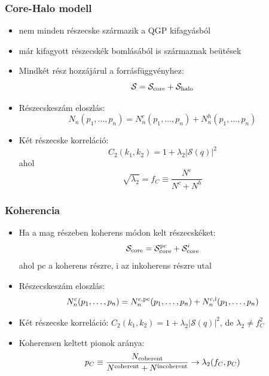 \documentclass{beamer}
\begin{document}
\begin{frame}
\frametitle{Core-Halo modell}
\begin{itemize}
\setlength{\itemsep}{8pt}
\item nem minden részecske származik a QGP kifagyásból
\item már kifagyott részecskék bomlásából is származnak beütések
\item Mindkét rész hozzájárul a forrásfüggvényhez:
\begin{equation*}
\mathcal{S}=\mathcal{S}_{\rm core}+\mathcal{S}_{\rm halo}
\end{equation*}
\item Részecskeszám eloszlás:
\begin{equation*}
N_n(p_1,\dots,p_n) = N_n^{c}(p_1,\dots,p_n)+N_n^{h}(p_1,\dots,p_n)
\end{equation*}
\item Két részecske korreláció:
\begin{equation*}
C_2(k_1, k_2) =  1+\lambda_2|\mathcal{S}(q)|^2
\end{equation*}
ahol
\begin{equation*}
\sqrt{\lambda_2} =  f_C \equiv \frac{N^c}{N^c+N^h} 
\end{equation*}
\end{itemize}
\end{frame}

\begin{frame}
\frametitle{Koherencia}
\begin{itemize}
\setlength{\itemsep}{8pt}
\item Ha a mag részeben koherens módon kelt részecskéket:
\begin{equation*}
\mathcal{S}_{\rm core}=\mathcal{S}_{\rm core}^{\rm pc}+\mathcal{S}_{\rm core}^{i}
\end{equation*}
ahol pc a koherens részre, i az inkoherens részre utal
\item Részecskeszám eloszlás:
\begin{equation*}
N_n^{c}(p_1,\dots,p_n) = N_n^{c,{\rm pc}}(p_1,\dots,p_n)+N_n^{c, {\rm i}}(p_1,\dots,p_n)
\end{equation*}
\item Két részecske korreláció: $C_2(k_1, k_2) =  1+\lambda_2|\mathcal{S}(q)|^2$, de $\lambda_2 \neq f_C^2$
\item Koherensen keltett pionok aránya:
\begin{equation*}
p_C \equiv \frac{N_{\rm coherent}}{N^{\rm coherent}+N^{\rm incoherent}} \rightarrow \lambda_2(f_C, p_C)
\end{equation*}
\end{itemize}

\end{frame}
\end{document}
